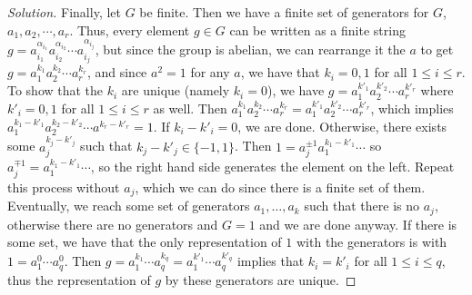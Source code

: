 \documentclass{article}
\begin{document}
\begin{proof}[Solution]
	Finally, let $G$ be finite.
	Then we have a finite set of generators for $G$,
	$a_1, a_2,\cdots,a_r$.
	Thus, every element $g \in G$ can be written as a finite string
	$g = a_{i_1}^{\alpha_{i_1}}a_{i_2}^{\alpha_{i_2}}\cdots a_{i_j}^{\alpha_{i_j}}$,
	but since the group is abelian, we can rearrange it the $a$ to get
	$g = a_1^{k_1}a_2^{k_2}\cdots a_r^{k_r}$,
	and since $a^2 = 1$ for any $a$,
	we have that $k_i = 0,1$ for all $1 \leq i \leq r$.
	To show that the $k_i$ are unique (namely $k_i = 0$),
	we have $g = a_1^{k'_1}a_2^{k'_2}\cdots a_r^{k'_r}$
	where $k'_i = 0,1$ for all $1 \leq i \leq r$ as well.
	Then $a_1^{k_1}a_2^{k_2}\cdots a_r^{k_r} = a_1^{k'_1}a_2^{k'_2}\cdots a_r^{k'_r}$,
	which implies $a_1^{k_1 - k'_1}a_2^{k_2-k'_2}\cdots a^{k_r - k'_r} = 1$.
	If $k_i - k'_i = 0$, we are done.
	Otherwise, there exists some $a_j^{k_j - k'_j}$
	such that $k_j - k'_j \in \{-1,1\}$.
	Then $1 = a_j^{\pm 1}a_1^{k_1 - k'_1}\cdots $
	so $a_j^{\mp 1} = a_1^{k_1 - k'_1}\cdots$,
	so the right hand side generates the element on the left.
	Repeat this process without $a_j$,
	which we can do since there is a finite set of them.
	Eventually, we reach some set of generators $a_1,\dots,a_k$
	such that there is no $a_j$,
	otherwise there are no generators and $G = 1$ and we are done anyway.
	If there is some set,
	we have that the only representation of $1$ with the generators
	is with $1 = a_1^0\cdots a_q^0$.
	Then $g = a_1^{k_1}\cdots a_q^{k_q} = a_1^{k'_1}\cdots a_q^{k'_q}$
	implies that $k_i = k'_i$ for all $1 \leq i \leq q$,
	thus the representation of $g$ by these generators are unique.


\end{proof}
\end{document}
